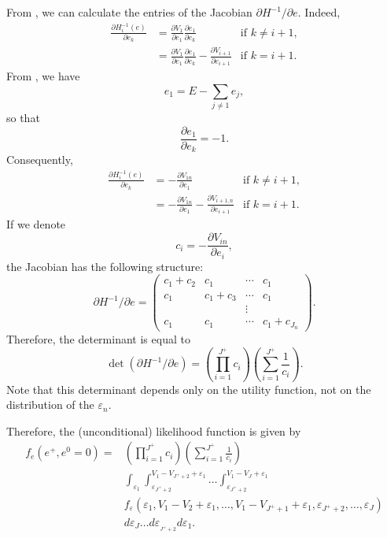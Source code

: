 \documentclass[12pt,a4paper]{article}
\begin{document}
From , we can calculate the entries of the Jacobian $\partial H^{-1}/\partial e$. Indeed,
\begin{align*}
  \frac{\partial H_i^{-1}(e)}{\partial e_k} &= \frac{\partial V_{1}}{\partial e_1}\frac{\partial e_1}{\partial e_k}  & \text{if } k \neq i+1, \\
  &= \frac{\partial V_{1}}{\partial e_1}\frac{\partial e_1}{\partial e_k} - \frac{\partial V_{i+1}}{\partial e_{i+1}}& \text{if } k = i+1.
\end{align*}
From , we have
\[
e_1 = E - \sum_{j\neq 1} e_j,
\]
so that
\[
\frac{\partial e_1}{\partial e_k} = -1.
\]
Consequently,
\begin{align*}
  \frac{\partial H_i^{-1}(e)}{\partial e_k} &= -\frac{\partial V_{1n}}{\partial e_1}  & \text{if } k \neq i+1, \\
  &= -\frac{\partial V_{1n}}{\partial e_1} - \frac{\partial V_{i+1,n}}{\partial e_{i+1}}& \text{if } k = i+1.
\end{align*}
If we denote
\begin{equation}
c_i =  - \frac{\partial V_{in}}{\partial e_{i}},
\end{equation}
the Jacobian has the following structure:
\[
\partial H^{-1}/\partial e= \left(
\begin{array}{cccc}
  c_1 + c_2 & c_1 & \cdots & c_1 \\
  c_1      & c_1 + c_3 & \cdots & c_1 \\
  &          &   \vdots    \\
  c_1    &  c_1 & \cdots & c_1 + c_{J_n}
\end{array}
\right).
\]
Therefore, the determinant is equal to
\[
\det(\partial H^{-1}/\partial e) = \left(\prod_{i=1}^{J^+} c_i\right)\left(\sum_{i=1}^{J^+}\frac{1}{c_i}\right).
\]
Note that this determinant depends only on the utility function, not on the distribution of the $\varepsilon_n$.

Therefore, the (unconditional) likelihood function  is given by
\begin{equation}
  \label{eq:density}
  \begin{aligned}
    f_e(e^+, e^0=0)  =&  \left(\prod_{i=1}^{J^+} c_i\right)\left(\sum_{i=1}^{J^+}\frac{1}{c_i}\right)\\
    &\int_{\varepsilon_1}\int_{\varepsilon_{J^+ +2}}^{V_1-V_{J^+ +2}+ \varepsilon_1}\ldots  \int_{\varepsilon_{J^+ +2}}^{V_1-V_{J}+ \varepsilon_1} \\
    &f_\varepsilon(\varepsilon_1, V_1-V_2+\varepsilon_1, \ldots, V_1-V_{{J^+}+1} + \varepsilon_1, \varepsilon_{J^+ +2}, \ldots, \varepsilon_J) \\
    &d\varepsilon_J\ldots d\varepsilon_{_{J^+ +2}}d\varepsilon_1.
\end{aligned}
 \end{equation}
\end{document}
